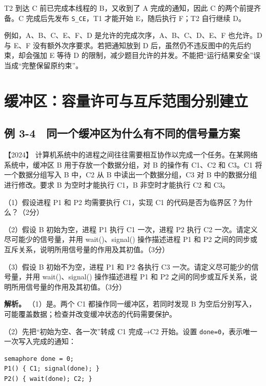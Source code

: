 T2 到达 C 前已完成本线程的 B，又收到了 A 完成的通知，因此 C 的两个前提齐备。C 完成后先发布 \allowbreak{}\texttt{S\_CE}，T1 才能开始 E，随后执行 F；T2 自行继续 D。

例如，A、B、C、E、F、D 是允许的完成次序，A、B、C、D、E、F 也允许。D 与 E、F 没有额外次序要求。若把通知放到 D 后，虽然仍不违反图中的先后约束，却会强加 E 等待 D 的限制，减少题目允许的并发。不能把``运行结果安全''误当成``完整保留原约束''。

\section{缓冲区：容量许可与互斥范围分别建立}\label{sec-buffer}

\subsection{例 3-4　同一个缓冲区为什么有不同的信号量方案}\label{ex-2024}

\noindent{}【2024】 计算机系统中的进程之间往往需要相互协作以完成一个任务。在某网络系统中，缓冲区 B 用于存放一个数据分组，对 B 的操作有 C1、C2 和 C3。C1 将一个数据分组写入 B 中，C2 从 B 中读出一个数据分组，C3 对 B 中的数据分组进行修改。要求 B 为空时才能执行 C1，B 非空时才能执行 C2 和 C3。

（1）假设进程 P1 和 P2 均需要执行 C1，实现 C1 的代码是否为临界区？为什么？（2分）

（2）假设 B 初始为空，进程 P1 执行 C1 一次，进程 P2 执行 C2 一次。请定义尽可能少的信号量，并用 wait()、signal() 操作描述进程 P1 和 P2 之间的同步或互斥关系，说明所用信号量的作用及其初值。（3分）

（3）假设 B 初始不为空，进程 P1 和 P2 各执行 C3 一次。请定义尽可能少的信号量，并用 wait()、signal() 操作描述进程 P1 和 P2 之间的同步或互斥关系，说明所用信号量的作用及其初值。（3分）


\textbf{解析。} （1）是。两个 C1 都操作同一缓冲区，若同时发现 B 为空后分别写入，可能覆盖数据；检查并改变缓冲状态的代码需要保护。

（2）先把``初始为空、各一次''转成 C1 完成→C2 开始。设置 \allowbreak{}\texttt{done=0}，表示唯一一次写入完成的通知：

\par\medskip\noindent
\begin{minipage}{\linewidth}
\begin{verbatim}
semaphore done = 0;
P1() { C1; signal(done); }
P2() { wait(done); C2; }
\end{verbatim}
\end{minipage}\par\medskip

